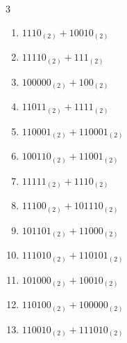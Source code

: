 \begin{multicols}{3}
\begin{enumerate}
  \item $1110_{(2)} + 10010_{(2)}$


\columnbreak %

\resetques

  \item $11110_{(2)} + 111_{(2)}$


  \item $100000_{(2)} + 100_{(2)}$


  \item $11011_{(2)} + 1111_{(2)}$


  \item $110001_{(2)} + 110001_{(2)}$


  \item $100110_{(2)} + 11001_{(2)}$


  \item $11111_{(2)} + 1110_{(2)}$


  \item $11100_{(2)} + 101110_{(2)}$


  \item $101101_{(2)} + 11000_{(2)}$


  \item $111010_{(2)} + 110101_{(2)}$


  \item $101000_{(2)} + 10010_{(2)}$


\columnbreak %

  \item $110100_{(2)} + 100000_{(2)}$


  \item $110010_{(2)} + 111010_{(2)}$


\end{enumerate}
\end{multicols}
